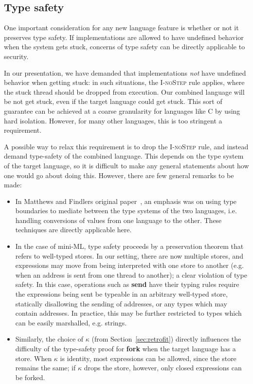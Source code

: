 \documentclass{sigplanconf}
\begin{document}
\subsection{Type safety}
\label{sec:extensions:types}

One important consideration for any new language feature is whether
or not it preserves type safety.  If implementations are allowed to
have undefined behavior when the system gets stuck, concerns of type
safety can be directly applicable to security.

In our presentation, we have demanded that implementations \emph{not}
have undefined behavior when getting stuck: in such situations, the
\textsc{I-noStep} rule applies, where the stuck thread should be dropped
from execution.  Our combined language will be not get stuck, even if
the target language could get stuck.  This sort of guarantee can be
achieved at a coarse granularity for languages like C by using hard
isolation.  However, for many other languages, this is too stringent a
requirement.

A possible way to relax this requirement is to drop the \textsc{I-noStep}
rule, and instead demand type-safety of the combined language.  This
depends on the type system of the target language, so it is difficult to
make any general statements about how one would go about doing this.  However,
there are few general remarks to be made:

\begin{itemize}
    \item In Matthews and Findlers original
        paper~\cite{Matthews:2007:OSM:1190216.1190220}, an emphasis was
        on using type boundaries to mediate between the type systems of
        the two languages, i.e. handling conversions of values from
        one language to the other.  These techniques are directly applicable here.

    \item In the case of mini-ML, type safety proceeds by a preservation theorem
        that refers to well-typed stores.  In our setting, there are now multiple
        stores, and expressions may move from being interpreted with one store
        to another (e.g. when an address is sent from one thread to
        another); a clear violation of type safety.  In this case, operations
        such as \textbf{send} have their typing rules require
        the expressions being sent be typeable in an arbitrary well-typed store,
        statically disallowing the sending of addresses, or any types which
        may contain addresses.  In practice, this may be further restricted to
        types which can be easily marshalled, e.g. strings.

    \item Similarly, the choice of $\kappa$ (from Section~\ref{sec:retrofit}) directly
        influences the difficulty of the type-safety proof for
        \textbf{fork} when the target language has a store.  When
        $\kappa$ is identity, most expressions can be allowed, since the store
        remains the same; if $\kappa$ drops the store, however, only closed expressions
        can be forked.
\end{itemize}
\end{document}
